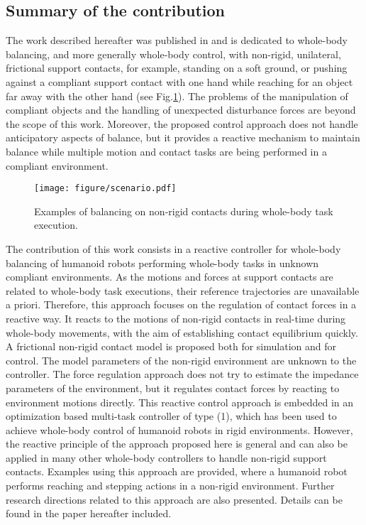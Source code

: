 \documentclass[12pt,a4paper,twoside]{article}
\begin{document}
\subsection{Summary of the contribution}
The work described hereafter was published in \cite{liu_IROS2015} and is dedicated to whole-body balancing, and more generally whole-body control, with non-rigid, unilateral, frictional support contacts, for example, standing on a soft ground, or pushing against a compliant support contact with one hand while reaching for an object far away with the other hand (see Fig.\ref{reaching}). The problems of the manipulation of compliant objects and the handling of unexpected disturbance forces are beyond the scope of this work. Moreover, the proposed control approach does not handle anticipatory aspects of balance, but it provides a reactive  mechanism to maintain balance while multiple motion and contact tasks are being performed in a compliant environment.\\
\begin{figure}[!t]
\centering
\vspace{5pt}
\texttt{[image: figure/scenario.pdf]}
\caption{Examples of balancing on non-rigid contacts during whole-body task execution.}
\label{reaching}
\end{figure}

The contribution of this work consists in a reactive controller for whole-body balancing of humanoid robots performing whole-body tasks in unknown compliant environments. As the motions and forces at support contacts are related to whole-body task executions, their reference trajectories are unavailable a priori. Therefore, this approach focuses on the regulation of contact forces in a reactive way. It reacts to the motions of non-rigid contacts in real-time during whole-body movements, with the aim of establishing contact equilibrium quickly.\\

A frictional non-rigid contact model is proposed both for simulation and for control. The model parameters of the non-rigid environment are unknown to the controller. The force regulation approach does not try to estimate the impedance parameters of the environment, but it regulates contact forces by reacting to environment motions directly. This reactive control approach is embedded in an optimization based multi-task controller of type (1), which has been used to achieve whole-body control of humanoid robots in rigid environments. However, the reactive principle of the approach proposed here is general and can also be applied in many other whole-body controllers to handle non-rigid support contacts. Examples using this approach are provided, where a humanoid robot performs reaching and stepping actions in a non-rigid environment. Further research directions related to this approach are also presented. Details can be found in the paper hereafter included.
\end{document}
